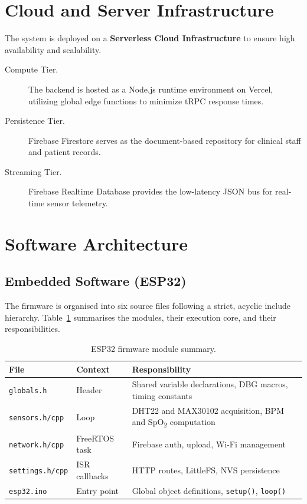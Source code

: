 \section{Cloud and Server Infrastructure}
The system is deployed on a \textbf{Serverless Cloud Infrastructure} to ensure high availability and scalability.
\begin{description}
	\item[Compute Tier.] The backend is hosted as a Node.js runtime environment on Vercel, utilizing global edge functions to minimize tRPC response times.
	\item[Persistence Tier.] Firebase Firestore serves as the document-based repository for clinical staff and patient records.
	\item[Streaming Tier.] Firebase Realtime Database provides the low-latency JSON bus for real-time sensor telemetry.
\end{description}

\section{Software Architecture}

\subsection*{Embedded Software (ESP32)}

The firmware is organised into six source files following a strict, acyclic include
hierarchy.
Table~\ref{tab:sw_modules} summarises the modules, their execution core, and their
responsibilities.

\begin{table}[H]
	\centering
	\caption{ESP32 firmware module summary.}
	\label{tab:sw_modules}
	\begin{tabularx}{\linewidth}{lllX}
		\toprule
		\textbf{File}           & \textbf{Context} & \textbf{Responsibility}                                                  \\
		\midrule
		\texttt{globals.h}      & Header           & Shared variable declarations, DBG macros, timing constants               \\
		\texttt{sensors.h/cpp}  & Loop             & DHT22 and MAX30102 acquisition, BPM and SpO\textsubscript{2} computation \\
		\texttt{network.h/cpp}  & FreeRTOS task    & Firebase auth, upload, Wi-Fi management                                  \\
		\texttt{settings.h/cpp} & ISR callbacks    & HTTP routes, LittleFS, NVS persistence                                   \\
		\texttt{esp32.ino}      & Entry point      & Global object definitions, \texttt{setup()}, \texttt{loop()}             \\
		\bottomrule
	\end{tabularx}
\end{table}


